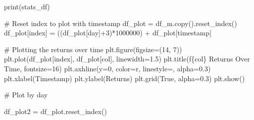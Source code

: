 \documentclass[
  letterpaper,
  DIV=11,
  numbers=noendperiod]{scrartcl}
\newenvironment{Shaded}{\begin{snugshade}}{\end{snugshade}}
\newcommand{\BuiltInTok}[1]{\textcolor[rgb]{0.00,0.23,0.31}{#1}}
\newcommand{\CommentTok}[1]{\textcolor[rgb]{0.37,0.37,0.37}{#1}}
\newcommand{\DecValTok}[1]{\textcolor[rgb]{0.68,0.00,0.00}{#1}}
\newcommand{\FloatTok}[1]{\textcolor[rgb]{0.68,0.00,0.00}{#1}}
\newcommand{\NormalTok}[1]{\textcolor[rgb]{0.00,0.23,0.31}{#1}}
\newcommand{\OperatorTok}[1]{\textcolor[rgb]{0.37,0.37,0.37}{#1}}
\newcommand{\SpecialCharTok}[1]{\textcolor[rgb]{0.37,0.37,0.37}{#1}}
\newcommand{\SpecialStringTok}[1]{\textcolor[rgb]{0.13,0.47,0.30}{#1}}
\newcommand{\StringTok}[1]{\textcolor[rgb]{0.13,0.47,0.30}{#1}}
\newcommand{\VariableTok}[1]{\textcolor[rgb]{0.07,0.07,0.07}{#1}}
\begin{document}
\begin{Shaded}
\begin{Highlighting}[]
    \BuiltInTok{print}\NormalTok{(stats\_df)}

    \CommentTok{\# Reset index to plot with timestamp}
\NormalTok{    df\_plot }\OperatorTok{=}\NormalTok{ df\_m.copy().reset\_index()}
\NormalTok{    df\_plot[}\StringTok{\textquotesingle{}index\textquotesingle{}}\NormalTok{] }\OperatorTok{=}\NormalTok{ ((df\_plot[}\StringTok{\textquotesingle{}day\textquotesingle{}}\NormalTok{]}\OperatorTok{+}\DecValTok{3}\NormalTok{)}\OperatorTok{*}\DecValTok{1000000}\NormalTok{) }\OperatorTok{+}\NormalTok{ df\_plot[}\StringTok{\textquotesingle{}timestamp\textquotesingle{}}\NormalTok{]}

    \CommentTok{\# Plotting the returns over time}
\NormalTok{    plt.figure(figsize}\OperatorTok{=}\NormalTok{(}\DecValTok{14}\NormalTok{, }\DecValTok{7}\NormalTok{))}
\NormalTok{    plt.plot(df\_plot[}\StringTok{\textquotesingle{}index\textquotesingle{}}\NormalTok{], df\_plot[col], linewidth}\OperatorTok{=}\FloatTok{1.5}\NormalTok{)}
\NormalTok{    plt.title(}\SpecialStringTok{f\textquotesingle{}}\SpecialCharTok{\{}\NormalTok{col}\SpecialCharTok{\}}\SpecialStringTok{ Returns Over Time\textquotesingle{}}\NormalTok{, fontsize}\OperatorTok{=}\DecValTok{16}\NormalTok{)}
\NormalTok{    plt.axhline(y}\OperatorTok{=}\DecValTok{0}\NormalTok{, color}\OperatorTok{=}\StringTok{\textquotesingle{}r\textquotesingle{}}\NormalTok{, linestyle}\OperatorTok{=}\StringTok{\textquotesingle{}{-}\textquotesingle{}}\NormalTok{, alpha}\OperatorTok{=}\FloatTok{0.3}\NormalTok{)}
\NormalTok{    plt.xlabel(}\StringTok{\textquotesingle{}Timestamp\textquotesingle{}}\NormalTok{)}
\NormalTok{    plt.ylabel(}\StringTok{\textquotesingle{}Returns\textquotesingle{}}\NormalTok{)}
\NormalTok{    plt.grid(}\VariableTok{True}\NormalTok{, alpha}\OperatorTok{=}\FloatTok{0.3}\NormalTok{)}
\NormalTok{    plt.show()}

    \CommentTok{\# Plot by day}

\NormalTok{    df\_plot2 }\OperatorTok{=}\NormalTok{ df\_plot.reset\_index()}


\end{Highlighting}
\end{Shaded}
\end{document}
